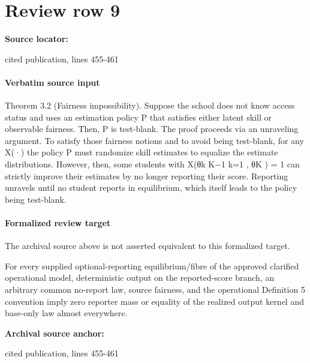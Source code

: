 \documentclass[10pt]{article}
\begin{document}
\section*{Review row 9}
\textbf{Source locator:} {\footnotesize\raggedright cited publication, lines 455-\allowbreak{}461\par}
\paragraph{Verbatim source input}
\begin{ReviewVerbatim}
Theorem 3.2 (Fairness impossibility). Suppose the school does not know access status and uses an
estimation policy P that satisfies either latent skill or observable fairness. Then, P is test-blank.
The proof proceeds via an unraveling argument. To satisfy those fairness notions and to avoid
being test-blank, for any X(·) the policy P must randomize skill estimates to equalize the estimate distributions. However, then, some students with X({θk }K−1
k=1 , θK ) = 1 can strictly improve
their estimates by no longer reporting their score. Reporting unravels until no student reports in
equilibrium, which itself leads to the policy being test-blank.
\end{ReviewVerbatim}


\paragraph{Formalized review target}
The archival source above is not asserted equivalent to this formalized target.
\begin{ReviewVerbatim}
For every supplied optional-reporting equilibrium/fibre of the approved clarified operational model, deterministic output on the reported-score branch, an arbitrary common no-report law, source fairness, and the operational Definition 5 convention imply zero reporter mass or equality of the realized output kernel and base-only law almost everywhere.
\end{ReviewVerbatim}

\textbf{Archival source anchor:} {\footnotesize\raggedright cited publication, lines 455-\allowbreak{}461\par}
\end{document}
